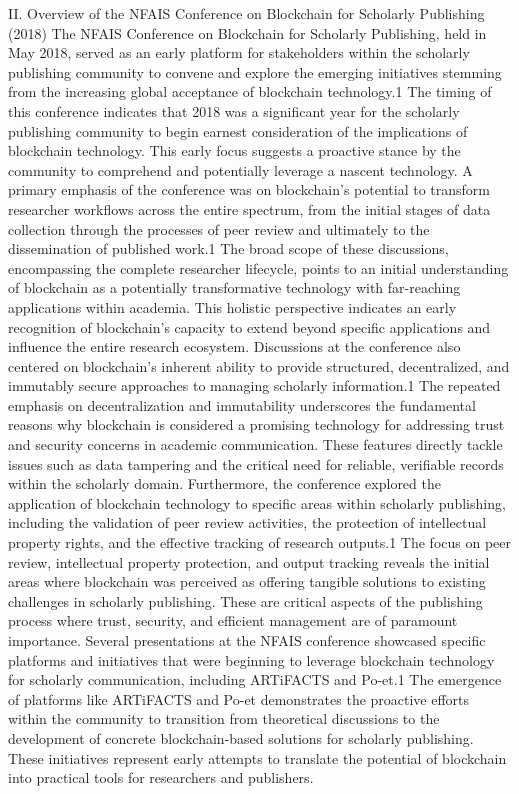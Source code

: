 \documentclass{article}
\begin{document}
II. Overview of the NFAIS Conference on Blockchain for Scholarly Publishing (2018)
The NFAIS Conference on Blockchain for Scholarly Publishing, held in May 2018, served as an early platform for stakeholders within the scholarly publishing community to convene and explore the emerging initiatives stemming from the increasing global acceptance of blockchain technology.1 The timing of this conference indicates that 2018 was a significant year for the scholarly publishing community to begin earnest consideration of the implications of blockchain technology. This early focus suggests a proactive stance by the community to comprehend and potentially leverage a nascent technology.
A primary emphasis of the conference was on blockchain's potential to transform researcher workflows across the entire spectrum, from the initial stages of data collection through the processes of peer review and ultimately to the dissemination of published work.1 The broad scope of these discussions, encompassing the complete researcher lifecycle, points to an initial understanding of blockchain as a potentially transformative technology with far-reaching applications within academia. This holistic perspective indicates an early recognition of blockchain's capacity to extend beyond specific applications and influence the entire research ecosystem.
Discussions at the conference also centered on blockchain's inherent ability to provide structured, decentralized, and immutably secure approaches to managing scholarly information.1 The repeated emphasis on decentralization and immutability underscores the fundamental reasons why blockchain is considered a promising technology for addressing trust and security concerns in academic communication. These features directly tackle issues such as data tampering and the critical need for reliable, verifiable records within the scholarly domain.
Furthermore, the conference explored the application of blockchain technology to specific areas within scholarly publishing, including the validation of peer review activities, the protection of intellectual property rights, and the effective tracking of research outputs.1 The focus on peer review, intellectual property protection, and output tracking reveals the initial areas where blockchain was perceived as offering tangible solutions to existing challenges in scholarly publishing. These are critical aspects of the publishing process where trust, security, and efficient management are of paramount importance.
Several presentations at the NFAIS conference showcased specific platforms and initiatives that were beginning to leverage blockchain technology for scholarly communication, including ARTiFACTS and Po-et.1 The emergence of platforms like ARTiFACTS and Po-et demonstrates the proactive efforts within the community to transition from theoretical discussions to the development of concrete blockchain-based solutions for scholarly publishing. These initiatives represent early attempts to translate the potential of blockchain into practical tools for researchers and publishers.
\end{document}
